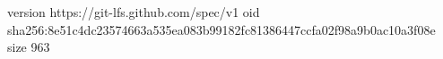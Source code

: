 version https://git-lfs.github.com/spec/v1
oid sha256:8e51c4dc23574663a535ea083b99182fc81386447ccfa02f98a9b0ac10a3f08e
size 963
